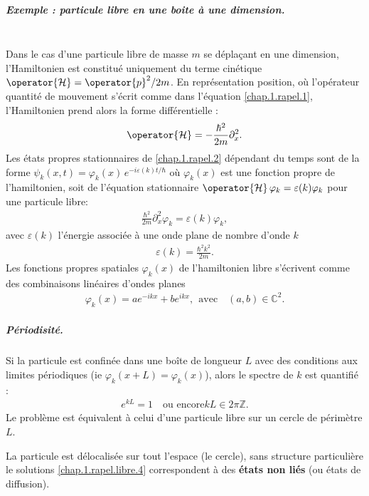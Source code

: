 \begin{mdframed}[
	linewidth=0.5pt, 
	backgroundcolor=gray!5, 
	roundcorner=50pt,	
	innerleftmargin=5pt,
    innerrightmargin=5pt,
    innertopmargin=-10pt,
    innerbottommargin=2pt,
    leftmargin=2pt,
    rightmargin=2pt
	]
\subparagraph{Exemple : particule libre en une boite à une dimension.} 
	{~}\\
	
	Dans le cas d’une particule libre de masse $m$ se déplaçant en une dimension, l’Hamiltonien est constitué uniquement du terme cinétique $\operator{\mathcal{H}} = \operator{p}^2 / 2m$. En représentation position, où l’opérateur quantité de mouvement s’écrit comme dans l’équation \eqref{chap.1.rapel.1}, l’Hamiltonien prend alors la forme différentielle :
	\begin{eqnarray}
		\operator{\mathcal{H}} = -\frac{\hbar^2}{2m} \partial_x^2.\label{chap.1.rapel.libre.1}
	\end{eqnarray}
	Les états propres stationnaires de \eqref{chap.1.rapel.2} dépendant du temps sont de la forme $\psi_k(x,t) = \varphi_k(x)\,e^{-i\varepsilon(k)t/\hbar}$ où $\varphi_k(x)$ est une fonction propre de l’hamiltonien,  soit de  l’équation stationnaire  $\operator{\mathcal{H}} \, \varphi_k = \varepsilon(k)\varphi_k$ \ie pour une particule libre:
	\begin{eqnarray}
		\frac{\hbar^2}{2m} \partial_x^2 \varphi_k = \varepsilon(k) \varphi_k,\label{chap.1.rapel.libre.2}
	\end{eqnarray}
	avec $\varepsilon(k)$ l’énergie associée à une onde plane de nombre d’onde $k$
	\begin{eqnarray}
		\varepsilon(k) = \frac{\hbar^2 k^2 }{2 m}\label{chap.1.rapel.libre.3}.
	\end{eqnarray}
	Les fonctions propres spatiales $\varphi_k(x)$ de l’hamiltonien libre s’écrivent comme des combinaisons linéaires d’ondes planes  
	\begin{eqnarray}
		\varphi_k(x) = a e^{-i k x} + b e^{i k x},~~ \mbox{avec}\quad  (a,b) \in \mathbb{C}^2\label{chap.1.rapel.libre.4}.
	\end{eqnarray}
\subparagraph{Périodisité.}
	Si la particule est confinée dans une boîte de longueur $L$ avec des conditions aux limites périodiques (ie $\varphi_k(x+L) = \varphi_k(x)$), alors le spectre de $k$ est quantifié : 
	\begin{eqnarray}
		e^{kL}= 1 \quad\mbox{ou encore} kL \in 2\pi\mathbb{Z}\label{chap.1.rapel.libre.5}.
	\end{eqnarray}
	Le problème est équivalent à celui d’une particule libre sur un cercle de périmètre $L$.\\
	
	\medskip
	
	La particule est délocalisée sur tout l’espace (le cercle), sans structure particulière \ie le solutions \eqref{chap.1.rapel.libre.4} correspondent à des {\bf états non liés} (ou états de diffusion).

\end{mdframed}

